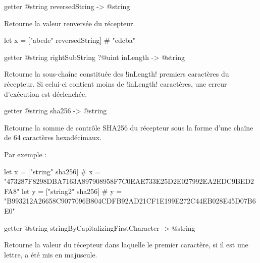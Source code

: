 \begin{galgas3box}
getter @string reversedString -> @string
\end{galgas3box}

Retourne la valeur renversée du récepteur.

\begin{galgas3}
let x = ["abcde" reversedString] # "edcba"
\end{galgas3}









\begin{galgas3box}
getter @string rightSubString ?@uint inLength -> @string
\end{galgas3box}

Retourne la sous-chaîne constituée des \ggst!inLength! premiers caractères du récepteur. Si celui-ci contient moins de \ggst!inLength! caractères, une erreur d'exécution est déclenchée.




\begin{galgas3box}
getter @string sha256 -> @string
\end{galgas3box}

Retourne la somme de contrôle SHA256 du récepteur sous la forme d'une chaîne de 64 caractères hexadécimaux.

Par exemple :
\begin{galgas3}
  let x = ["string"  sha256]
    # x = "473287F8298DBA7163A897908958F7C0EAE733E25D2E027992EA2EDC9BED2FA8"
  let y = ["string2" sha256]
    # y = "B993212A26658C9077096B804CDFB92AD21CF1E199E272C44EB028E45D07B6E0"
\end{galgas3}










\begin{galgas3box}
getter @string stringByCapitalizingFirstCharacter -> @string
\end{galgas3box}

Retourne la valeur du récepteur dans laquelle le premier caractère, si il est une lettre, a été mis en majuscule.








